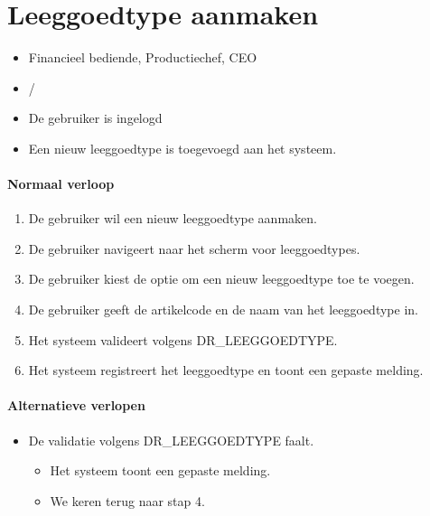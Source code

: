\section{Leeggoedtype aanmaken}
\label{uc:leeggoedtype-aanmaken}

\vspace{0.5em}

\begin{itemize}[leftmargin=3.5cm, labelsep=0.5cm, nosep]
    \item[\textbf{Primaire actor:}] Financieel bediende, Productiechef, CEO
    \item[\textbf{Stakeholders:}] /
    \item[\textbf{Precondities:}] De gebruiker is ingelogd
    \item[\textbf{Postcondities:}] Een nieuw leeggoedtype is toegevoegd aan het systeem.
\end{itemize}

\paragraph{Normaal verloop}
\begin{enumerate}[nosep]
    \item De gebruiker wil een nieuw leeggoedtype aanmaken.
    \item De gebruiker navigeert naar het scherm voor leeggoedtypes.
    \item De gebruiker kiest de optie om een nieuw leeggoedtype toe te voegen.
    \item De gebruiker geeft de artikelcode en de naam van het leeggoedtype in.
    \item Het systeem valideert volgens DR\_LEEGGOEDTYPE.
    \item Het systeem registreert het leeggoedtype en toont een gepaste melding.
\end{enumerate}

\paragraph{Alternatieve verlopen}
\begin{itemize}[nosep]
    \item[5A.] De validatie volgens DR\_LEEGGOEDTYPE faalt.
    \begin{itemize}
        \item[5A1.] Het systeem toont een gepaste melding.
        \item[5A2.] We keren terug naar stap 4.
    \end{itemize}
\end{itemize}

